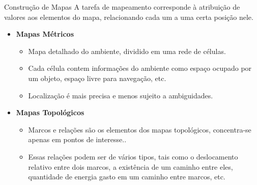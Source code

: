 \documentclass{beamer}
\newlength{\wideitemsep}
\let\olditem\item
\renewcommand{\item}{\setlength{\itemsep}{\wideitemsep}\olditem}
\begin{document}
\begin{frame}{Construção de Mapas}
A tarefa de mapeamento corresponde à atribuição de valores aos elementos do mapa, relacionando cada um a uma certa 
posição nele.
\begin{itemize}
 \item \textbf{Mapas Métricos}
    \begin{itemize}
    \item Mapa detalhado do ambiente, dividido em uma rede de células.
    \item Cada célula contem informações do ambiente como espaço ocupado por um objeto, 
    espaço livre para navegação, etc.
    \item Localização é mais precisa e menos sujeito a ambiguidades.
    \end{itemize}

 \item \textbf{Mapas Topológicos}
      \begin{itemize}
    \item  Marcos e relações são os elementos dos mapas topológicos, concentra-se apenas em pontos de interesse..
    \item Essas relações podem ser de vários tipos, tais como o deslocamento
relativo entre dois marcos, a existência de um caminho entre eles,
quantidade de energia gasto em um caminho entre marcos, etc.
    \end{itemize}
\end{itemize}
\end{frame}
\begin{comment}
\begin{frame}{Mapas Métricos}
Periodicamente, cada roteador:
\begin{itemize}
 \olditem verifica o estado de seus enlaces %
 \olditem envia as informações do estado dos enlaces aos roteadores adjacentes %
\end{itemize}
\end{frame}

\begin{frame}{Mapas Topológicos}
Periodicamente, cada roteador:
\begin{itemize}
 \olditem verifica o estado de seus enlaces %
 \olditem envia as informações do estado dos enlaces aos roteadores adjacentes %
\end{itemize}
\end{frame}
\end{comment}
\end{document}
